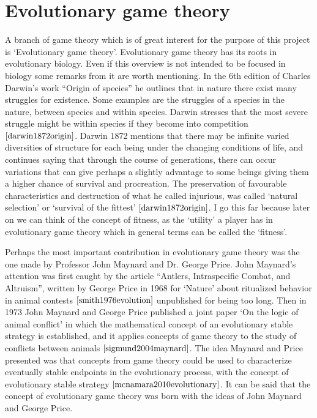 \section{Evolutionary game theory}\label{EGT}
A branch of game theory which is of great interest for the purpose of this project is `Evolutionary game theory'. Evolutionary game theory has its roots in evolutionary biology. Even if this overview is not intended to be focused in biology some remarks from it are worth mentioning. In the 6th edition of Charles Darwin's work ``Origin of species'' he outlines that in nature there exist many struggles for existence. Some examples are the struggles of a species in the nature, between species and within species. Darwin stresses that the most severe struggle might be within species if they become into competition $\cite{darwin1872origin}$. Darwin 1872 mentions that there may be infinite varied diversities of structure for each being under the changing conditions of life, and continues saying that through the course of generations, there can occur variations that can give perhaps a slightly advantage to some beings giving them a higher chance of survival and procreation. The preservation of favourable characteristics and destruction of what he called injurious, was called `natural selection' or `survival of the fittest' $\cite{darwin1872origin}$. I go this far because later on we can think of the concept of fitness, as the ‘utility’ a player has in evolutionary game theory which in general terms can be called the ‘fitness’.

Perhaps the most important contribution in evolutionary game theory was the one made by Professor John Maynard and Dr. George Price. John Maynard’s attention was first caught by the article ``Antlers, Intraspecific Combat, and Altruism'', written by George Price in 1968 for `Nature’ about ritualized behavior in animal contests $\cite{smith1976evolution}$ unpublished for being too long. Then in 1973 John Maynard and George Price published a joint paper ‘On the logic of animal conflict’ in which the mathematical concept of an evolutionary stable strategy is established, and it applies concepts of game theory to the study of conflicts between animals $\cite{sigmund2004maynard}$.  The idea Maynard and Price presented was that concepts from game theory could be used to characterize eventually stable endpoints in the evolutionary process, with the concept of evolutionary stable strategy $\cite{mcnamara2010evolutionary}$. It can be said that the concept of evolutionary game theory was born with the ideas of John Maynard and George Price.

